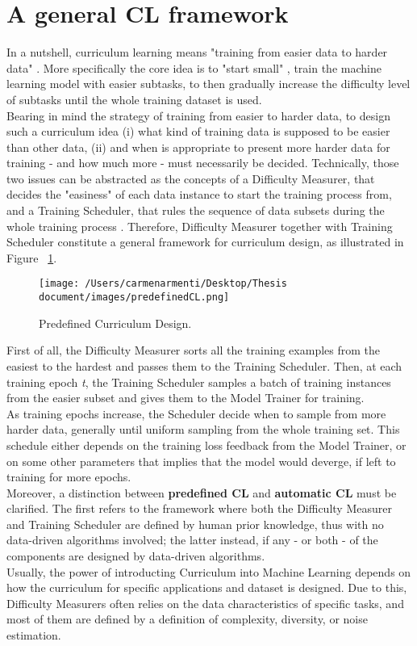 \section{A general CL framework}
In a nutshell, curriculum learning means "training from easier data to harder data" \cite{Wang2020}. More specifically the
core idea is to "start small" \cite{ELMAN199371}, train the machine learning model with easier subtasks, to then gradually increase
the difficulty level of subtasks until the whole training dataset is used.\\
Bearing in mind the strategy of training from easier to harder data, to design such a curriculum idea 
(i) what kind of training data is supposed to be easier than other data, (ii) and when is appropriate to present more harder
data for training - and how much more - must necessarily be decided.
Technically, those two issues can be abstracted as the concepts of a Difficulty Measurer, that decides the "easiness"
of each data instance to start the training process from, and a Training Scheduler, that rules the sequence of data subsets during 
the whole training process \cite{Wang2020}.
Therefore, Difficulty Measurer together with Training Scheduler constitute a general framework for curriculum design,
as illustrated in Figure ~\ref{fig:CLdesign}.
\begin{figure}[h]
    \begin{center}
        \texttt{[image: /Users/carmenarmenti/Desktop/Thesis document/images/predefinedCL.png]}
        \caption{\label{fig:CLdesign}Predefined Curriculum Design.}
    \end{center}
\end{figure}
First of all, the Difficulty Measurer sorts all the training examples from the easiest 
to the hardest and passes them to the Training Scheduler. Then, at each training epoch \textit{t}, the Training Scheduler
samples a batch of training instances from the easier subset and gives them to the Model Trainer for training.\\
As training epochs increase, the Scheduler decide when to sample from more harder data, generally until uniform sampling
from the whole training set. This schedule either depends on the training loss feedback from the Model Trainer, or on some other
parameters that implies that the model would deverge, if left to training for more epochs.\\
Moreover, a distinction between \textbf{predefined CL} and \textbf{automatic CL} must be clarified. The first refers to the framework
where both the Difficulty Measurer and Training Scheduler are defined by human prior knowledge, thus with no data-driven
algorithms involved; the latter instead, if any - or both - of the components are designed by data-driven algorithms.\\
Usually, the power of introducting Curriculum into Machine Learning depends on how the curriculum for specific
applications and dataset is designed. Due to this, Difficulty Measurers often relies on the data
characteristics of specific tasks, and most of them are defined by a definition of complexity, diversity, or noise estimation.

